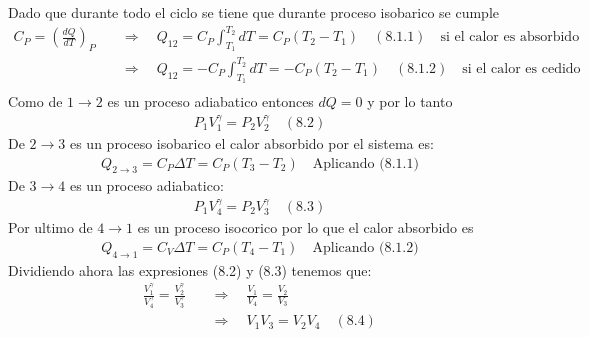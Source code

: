 \documentclass[a4paper]{article}
\begin{document}
    
    \begin{answer}[Punto 8]
        Dado que durante todo el ciclo se tiene que durante proceso isobarico se cumple
        \begin{align*}
            C_P = \left( \frac{dQ}{dT} \right)_P  \quad &\Rightarrow \quad Q_{12} = C_P \int _{T_1}^{T_2} dT = C_P (T_2 - T_1) \quad (8.1.1) \quad \text{si el calor es absorbido}\\
            &\Rightarrow \quad Q_{12} = -C_P \int _{T_1}^{T_2} dT = -C_P (T_2 - T_1) \quad (8.1.2) \quad \text{si el calor es cedido}\\
        \end{align*}
        Como de $1 \rightarrow 2$ es un proceso adiabatico entonces $dQ = 0$ y por lo tanto
        \begin{align*}
            P_1V_1^\gamma = P_2V_2^\gamma \quad (8.2)
        \end{align*}
        De $2 \rightarrow 3$ es un proceso isobarico el calor absorbido por el sistema es:
        \begin{align*}
            Q_{2\rightarrow 3} = C_P \Delta T = C_P (T_3 - T_2) \quad \text{Aplicando (8.1.1)}
        \end{align*}
        De $3 \rightarrow 4$ es un proceso adiabatico:
        \begin{align*}
            P_1V_4^\gamma = P_2V_3^\gamma \quad (8.3)
        \end{align*}
        Por ultimo de $4 \rightarrow 1$ es un proceso isocorico por lo que el calor absorbido es
        \begin{align*}
            Q_{4\rightarrow 1} = C_V \Delta T = C_P (T_4 - T_1) \quad \text{Aplicando (8.1.2)}
        \end{align*}
        Dividiendo ahora las expresiones (8.2) y (8.3) tenemos que:
        \begin{align*}
            \frac{V_1^\gamma}{V_4^\gamma} = \frac{V_2^\gamma}{V_3^\gamma} \quad &\Rightarrow \quad \frac{V_1}{V_4} = \frac{V_2}{V_3}\\
            & \Rightarrow \quad V_1 V_3 = V_2 V_4 \quad (8.4)
        \end{align*}


\end{answer}
\end{document}
